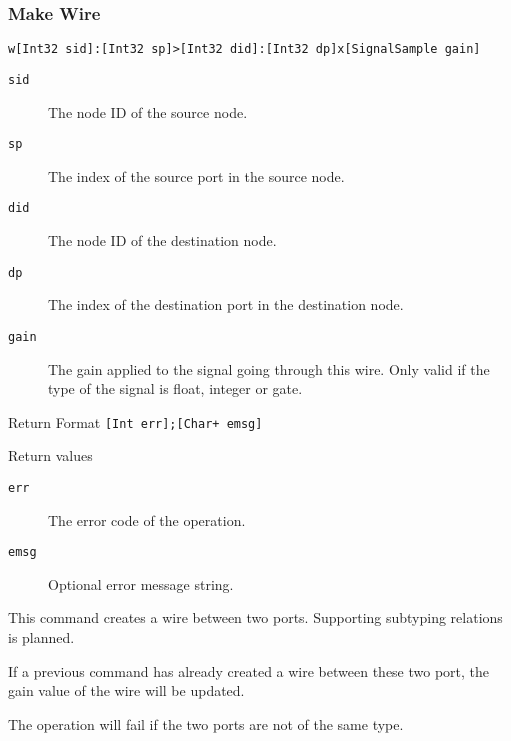 \documentclass{report}
\newcommand{\inlinecode}[1]{\begin{mdframed}[backgroundcolor=black!10]#1\end{mdframed}}
\begin{document}
\subsubsection{Make Wire}
\inlinecode{
\begin{description}\sloppy
\item[Command Format] \lstinline{w[Int32 sid]:[Int32 sp]>[Int32 did]:[Int32 dp]x[SignalSample gain]}
\item[Command Arguments]\hfill
  \begin{description}
  \item[\texttt{sid}] The node ID of the source node.
  \item[\texttt{sp}] The index of the source port in the source node.
  \item[\texttt{did}] The node ID of the destination node.
  \item[\texttt{dp}] The index of the destination port in the destination node.
  \item[\texttt{gain}] The gain applied to the signal going through this wire. Only valid if the type of the signal is float, integer or gate.
  \end{description}
\item[Return Format] \lstinline|[Int err];[Char+ emsg]|
\item[Return values]\hfill
  \begin{description}
  \item[\texttt{err}] The error code of the operation.
  \item[\texttt{emsg}] Optional error message string.
  \end{description}
\end{description}}\par
This command creates a wire between two ports. Supporting subtyping relations is planned.\par
If a previous command has already created a wire between these two port, the gain value of the wire will be updated.\par
The operation will fail if the two ports are not of the same type.
\end{document}

